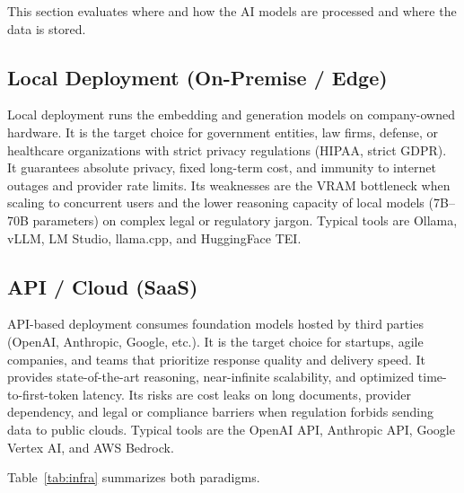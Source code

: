 \documentclass[11pt,a4paper]{article}
\begin{document}
This section evaluates where and how the AI models are processed and where
the data is stored.

\subsection{Local Deployment (On-Premise / Edge)}

Local deployment runs the embedding and generation models on company-owned
hardware. It is the target choice for government entities, law firms, defense,
or healthcare organizations with strict privacy regulations (HIPAA, strict
GDPR). It guarantees absolute privacy, fixed long-term cost, and immunity to
internet outages and provider rate limits. Its weaknesses are the VRAM
bottleneck when scaling to concurrent users and the lower reasoning capacity
of local models (7B--70B parameters) on complex legal or regulatory jargon.
Typical tools are Ollama, vLLM, LM Studio, llama.cpp, and HuggingFace TEI.

\subsection{API / Cloud (SaaS)}

API-based deployment consumes foundation models hosted by third parties
(OpenAI, Anthropic, Google, etc.). It is the target choice for startups,
agile companies, and teams that prioritize response quality and delivery
speed. It provides state-of-the-art reasoning, near-infinite scalability, and
optimized time-to-first-token latency. Its risks are cost leaks on long
documents, provider dependency, and legal or compliance barriers when
regulation forbids sending data to public clouds. Typical tools are the
OpenAI API, Anthropic API, Google Vertex AI, and AWS Bedrock.

Table~\ref{tab:infra} summarizes both paradigms.
\end{document}
